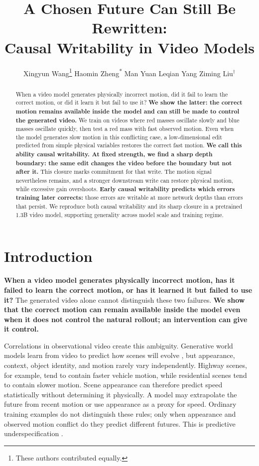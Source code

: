 \documentclass{article}
\title{A Chosen Future Can Still Be Rewritten:\\
Causal Writability in Video Models}
\author{%
Xingyun Wang\thanks{These authors contributed equally.} \And
Haomin Zheng\textsuperscript{*} \And
Man Yuan
\AND
Leqian Yang \And
Ziming Liu$^{\dagger}$
}
\newcommand{\introhighlight}[1]{{\bfseries #1}}
\begin{document}
\maketitle

\begin{abstract}
When a video model generates physically incorrect motion, did it fail to learn
the correct motion, or did it learn it but fail to use it?
\textbf{We show the latter: the correct motion remains available inside the
model and can still be made to control the generated video.} We train on videos
where red masses oscillate slowly and blue masses oscillate quickly, then test a
red mass with fast observed motion. Even when the model generates slow motion in
this conflicting case, a low-dimensional edit predicted from simple physical
variables restores the correct fast motion. \textbf{We call this ability causal
writability. At fixed strength, we find a sharp depth boundary: the same edit
changes the video before the boundary but not after it.} This closure marks
commitment for that write. The motion signal nevertheless remains, and a
stronger downstream write can restore physical motion, while excessive gain
overshoots. \textbf{Early causal writability predicts which errors training
later corrects:} those errors are writable at more network depths than errors
that persist. We reproduce both causal writability and its sharp closure in a
pretrained 1.3B video model, supporting generality across model scale and
training regime.
\end{abstract}

\section{Introduction}

\introhighlight{When a video model generates physically incorrect motion, has it failed
to learn the correct motion, or has it learned it but failed to use it?} The
generated video alone cannot distinguish these two failures. \introhighlight{We show
that the correct motion can remain available inside the model even when it does
not control the natural rollout; an intervention can give it control.}

Correlations in observational video create this ambiguity.
Generative world models learn from video to predict how scenes will evolve
\citep{ha2018worldmodels,hafner2020dream,ho2022video}, but appearance, context,
object identity, and motion rarely vary independently. Highway scenes, for
example, tend to contain faster vehicle motion, while residential scenes tend to
contain slower motion. Scene appearance can therefore predict speed statistically
without determining it physically. A model may extrapolate the future from recent
motion or use appearance as a proxy for speed. Ordinary training examples do not
distinguish these rules; only when appearance and observed motion conflict do they
predict different futures. This is predictive underspecification
\citep{geirhos2020shortcut,damour2022underspecification}.
\end{document}

